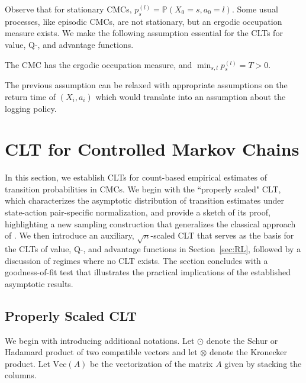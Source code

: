 \documentclass[twoside,11pt]{article}
\newcommand{\pow}[1]{^{(#1)}}%
\renewcommand{\Vec}[1]{\text{Vec}\lp #1\rp}
\numberwithin{equation}{section}
\newcommand{\lp}{\left(}
\newcommand{\rp}{\right)}
\newcommand{\Pbb}{\mathbb{P}}
\newcommand{\prob}{\Pbb}
\begin{document}
Observe that for stationary CMCs, $p_s\pow l=\prob(X_0=s,a_0=l)$.  
Some usual processes, like episodic CMCs, are not stationary, but an ergodic occupation measure exists. 
We make the following assumption essential for the CLTs for value, Q-, and advantage functions.
\begin{assumption}
\label{ass:semi-ergodic}
    The CMC has the ergodic occupation measure, and $\min_{s,l} p_s \pow l = T>0$.
\end{assumption}
The previous assumption can be relaxed with appropriate assumptions on the return time of $(X_i,a_i)$ which would translate into an assumption about the logging policy. 
\section{CLT for Controlled Markov Chains}
\label{sec:CLT}
In this section, we establish CLTs for count-based empirical estimates of transition probabilities in CMCs.
We begin with the ``properly scaled" CLT, which characterizes the asymptotic distribution of transition estimates under state-action pair-specific normalization, and provide a sketch of its proof, highlighting a new sampling construction that generalizes the classical approach of \citet{billingsley1961statistical}. 
We then introduce an auxiliary, $\sqrt{n}$-scaled CLT that serves as the basis for the CLTs of value, Q-, and advantage functions in Section~\ref{sec:RL}, followed by a discussion of regimes where no CLT exists. 
The section concludes with a goodness-of-fit test that illustrates the practical implications of the established asymptotic results.

\subsection{Properly Scaled CLT}
We begin with introducing additional notations.
Let $\odot$ denote the Schur or Hadamard product of two compatible vectors and let $\otimes$ denote the Kronecker product. 
Let $\Vec A$ be the vectorization of the matrix $A$ given by stacking the columns. 
\end{document}
